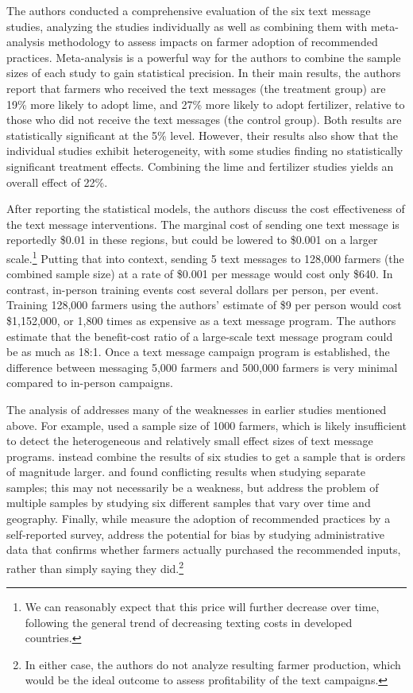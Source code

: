 \documentclass[12pt]{article}
\begin{document}
The authors conducted a comprehensive evaluation of the six text message studies, analyzing the studies individually as well as combining them with meta-analysis methodology to assess impacts on farmer adoption of recommended practices. Meta-analysis is a powerful way for the authors to combine the sample sizes of each study to gain statistical precision. In their main results, the authors report that farmers who received the text messages (the treatment group) are 19\% more likely to adopt lime, and 27\% more likely to adopt fertilizer, relative to those who did not receive the text messages (the control group). Both results are statistically significant at the 5\% level. However, their results also show that the individual studies exhibit heterogeneity, with some studies finding no statistically significant treatment effects. Combining the lime and fertilizer studies yields an overall effect of 22\%.

After reporting the statistical models, the authors discuss the cost effectiveness of the text message interventions. The marginal cost of sending one text message is reportedly \$0.01 in these regions, but could be lowered to \$0.001 on a larger scale.\footnote{We can reasonably expect that this price will further decrease over time, following the general trend of decreasing texting costs in developed countries.} Putting that into context, sending 5 text messages to 128,000 farmers (the combined sample size) at a rate of \$0.001 per message would cost only \$640. In contrast, in-person training events cost several dollars per person, per event. Training 128,000 farmers using the authors' estimate of \$9 per person would cost \$1,152,000, or 1,800 times as expensive as a text message program. The authors estimate that the benefit-cost ratio of a large-scale text message program could be as much as 18:1. Once a text message campaign program is established, the difference between messaging 5,000 farmers and 500,000 farmers is very minimal compared to in-person campaigns.

The analysis of \textcite{fabregas_digital_2025} addresses many of the weaknesses in earlier studies mentioned above. For example, \textcite{fafchamps_impact_2012} used a sample size of 1000 farmers, which is likely insufficient to detect the heterogeneous and relatively small effect sizes of text message programs. \textcite{fabregas_digital_2025} instead combine the results of six studies to get a sample that is orders of magnitude larger. \textcite{casaburi_harnessing_2019} and \textcite{casaburi_management_2016} found conflicting results when studying separate samples; this may not necessarily be a weakness, but \textcite{fabregas_digital_2025} address the problem of multiple samples by studying six different samples that vary over time and geography. Finally, while \textcite{carrion-yaguana_promoting_2020} measure the adoption of recommended practices by a self-reported survey, \textcite{fabregas_digital_2025} address the potential for bias by studying administrative data that confirms whether farmers actually purchased the recommended inputs, rather than simply saying they did.\footnote{In either case, the authors do not analyze resulting farmer production, which would be the ideal outcome to assess profitability of the text campaigns.}
\end{document}
